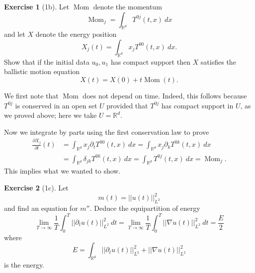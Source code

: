 \documentclass[10pt]{article}
\newcommand{\RR}{\mathbb{R}}
\DeclareMathOperator{\Mom}{Mom}
\theoremstyle{definition}
\newtheorem{exer}{Exercise}
\begin{document}
\begin{exer}[1b]
Let $\Mom$ denote the momentum
$$\Mom_j = \int_{\RR^d} T^{0j}(t, x) ~dx$$
and let $X$ denote the energy position
$$X_j(t) = \int_{\RR^d} x_j T^{00}(t, x) ~dx.$$
Show that if the initial data $u_0,u_1$ has compact support then $X$ satisfies the ballistic motion equation
$$X(t) = X(0) + t\Mom(t).$$
\end{exer}

We first note that $\Mom$ does not depend on time. Indeed, this follows because $T^{0j}$ is conserved in an open set $U$ provided that $T^{0j}$ has compact support in $U$, as we proved above; here we take $U = \RR^d$.

Now we integrate by parts using the first conservation law to prove
\begin{align*}
\frac{\partial X_j}{\partial t}(t) &= \int_{\RR^d} x_j \partial_t T^{00}(t, x) ~dx
= \int_{\RR^d} x_j \partial_k T^{0k}(t, x) ~dx\\
&= \int_{\RR^d} \delta_{jk} T^{0k}(t, x) ~dx
= \int_{\RR^d} T^{0j}(t, x) ~dx = \Mom_j.
\end{align*}
This implies what we wanted to show.

\begin{exer}[1c]
Let
$$m(t) = ||u(t)||_{L^2}^2$$
and find an equation for $m''$. Deduce the equipartition of energy
$$\lim_{T \to \infty} \frac{1}{T} \int_0^T ||\partial_t u(t)||_{L^2}^2 ~dt = \lim_{T \to \infty} \frac{1}{T} \int_0^T ||\nabla u(t)||_{L^2}^2 ~dt = \frac{E}{2}$$
where
$$E = \int_{\RR^d} ||\partial_t u(t)||_{L^2}^2 + ||\nabla u(t)||_{L^2}^2$$
is the energy.
\end{exer}
\end{document}
